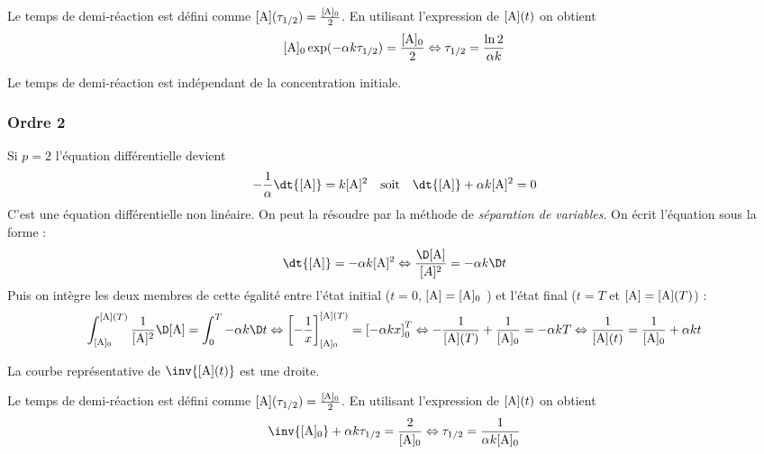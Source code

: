 \documentclass{cours}
\begin{document}
Le temps de demi-réaction est défini comme $[\ce{A}](\tau_{1/2}) = \frac{[\ce{A}]_0}{2}$. En utilisant l'expression de $[\ce{A}](t)$ on obtient 
\[
[\ce{A}]_0\exp(-\alpha k \tau_{1/2}) = \frac{[\ce{A}]_0}{2} \Leftrightarrow \tau_{1/2} = \frac{\ln 2}{\alpha k}
\]

Le temps de demi-réaction est indépendant de la concentration initiale.


\subsubsection{Ordre 2}%
\label{ssub:ordre_1}
Si $p=2$ l'équation différentielle devient 
\[-\frac{1}{\alpha}\dt{[\ce{A}]} = k [\ce{A}]^2 \quad \text{soit}\quad \dt{[\ce{A}]} + \alpha k [\ce{A}]^2 = 0
\]
C'est une équation différentielle non linéaire. On peut la résoudre par la méthode de \emph{séparation de variables}. On écrit l'équation sous la forme : 
\[
\dt{[\ce{A}]} = -\alpha k [\ce{A}] ^2 \Leftrightarrow \frac{\D [\ce{A}]}{[A]^2}=-\alpha k \D t
\]
Puis on intègre les deux membres de cette égalité entre l'état initial ($t=0$, $[\ce{A}]=[\ce{A}]_0$ ) et l'état final ($t=T$ et $[\ce{A}] = [\ce{A}](T)$) :  
\[
\int_{[\ce{A}]_0}^{[\ce{A}](T)} \frac{1}{[\ce{A}]^2}\D [\ce{A}] = \int_0^T -\alpha k \D t \Leftrightarrow \left[-\frac{1}{x}\right]_{[\ce{A}]_0}^{[\ce{A}](T)} = \left[-\alpha k x\right]_0^T \Leftrightarrow -\frac{1}{[\ce{A}](T)} + \frac{1}{[\ce{A}]_0} = -\alpha k T \Leftrightarrow  \frac{1}{[\ce{A}](t)} = \frac{1}{[\ce{A}]_0} + \alpha k t
\]

La courbe représentative de $\inv{[\ce{A}](t)}$ est une droite.
\begin{center}
\end{center}

Le temps de demi-réaction est défini comme $[\ce{A}](\tau_{1/2}) = \frac{[\ce{A}]_0}{2}$. En utilisant l'expression de $[\ce{A}](t)$ on obtient 
\[
\inv{[\ce{A}]_0} + \alpha k \tau_{1/2} = \frac{2}{[\ce{A}]_0} \Leftrightarrow \tau_{1/2} = \frac{1}{\alpha k [\ce{A}]_0}
\]
\end{document}
